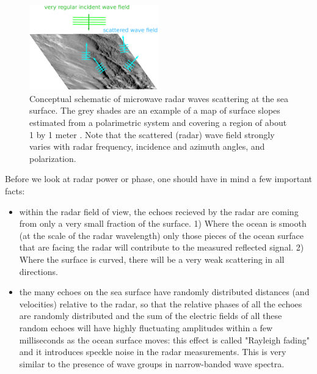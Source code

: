 \begin{figure}[htb]
\centerline{\includegraphics[width=0.5\textwidth]{FIGS_CH_SAT/scatter.pdf}}
  \caption{Conceptual schematic of microwave radar waves scattering at the sea surface. The grey shades are an example of a map of surface slopes estimated from a polarimetric system and covering a region of about 1 by 1 meter \citep{Laxague&al.2018}.  Note that the scattered (radar) wave field strongly varies with radar frequency, incidence and azimuth angles,  and polarization.  }\label{fig:scatter}
\end{figure}
Before we look at radar power or phase, one should have in mind a few important facts:
\begin{itemize}
\item within the radar field of view, the echoes recieved by the radar are coming from only a very small fraction of the surface. 1) Where the ocean is smooth (at the scale of the radar wavelength) only those pieces of the ocean surface that are facing the radar will contribute to the measured reflected signal. 2) Where the surface is curved, there will be a very weak scattering in all directions. 
\item the many echoes on the sea surface have randomly distributed distances (and velocities) relative to the radar, so that  the relative phases of all the echoes are randomly distributed and the sum of the electric fields of all these random echoes will have highly fluctuating amplitudes within a few milliseconds as the ocean surface moves: this effect is called "Rayleigh fading" and it introduces speckle noise in the radar measurements. This is very similar to the presence of wave groups in narrow-banded wave spectra. 
\end{itemize}

